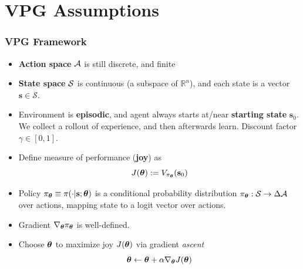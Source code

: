 \section{VPG Assumptions}
\begin{frame}
    \frametitle{VPG Framework}
    \begin{itemize}
        \item \textbf{Action space} $\A$ is still discrete, and finite %
    \item \textbf{State space} $\S$ is continuous (a subspace of $\mathbb{R}^n$), and
    each state is a vector $\mathbf{s} \in \mathcal{S}$.
    \item Environment is \textbf{episodic}, and agent always starts at/near \textbf{starting 
    state} $\mathbf{s}_0$. We collect a rollout of experience, and then afterwards learn. Discount
    factor $\gamma \in [0, 1]$.
    \item Define measure of performance (\textbf{joy}) as
    $$
    J(\bth) := V_{\pi_\bth}(\mathbf{s}_0)
    $$
    \item Policy $\pi_\bth \equiv \pi(\cdot | \mathbf{s}; \bth)$ is a conditional probability 
    distribution $\pi_\bth : \S \to \Delta \A$ over actions, mapping state to a logit vector over actions.
    \item Gradient $\nabla_\bth \pi_\bth$ is well-defined.
    \item Choose $\bth$ to maximize joy $J(\bth)$ via gradient \textit{ascent}
    $$
    \bth \leftarrow \bth + \alpha \nabla_{\bth} J(\bth) 
    $$
    

\end{itemize}
\end{frame}
